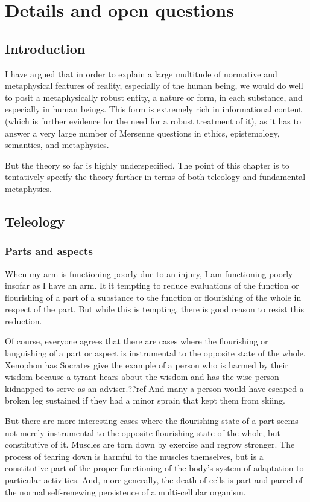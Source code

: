 \def\mychapter{X}

\chapter{Details and open questions}\label{ch:details}
\section{Introduction}
I have argued that in order to explain a large multitude of normative and metaphysical features 
of reality, especially of the human being, we would do well to posit a metaphysically robust 
entity, a nature or form, in each substance, and especially in human beings. This form is extremely rich 
in informational content (which is further evidence for the need for a robust treatment of it), 
as it has to answer a very large number of Mersenne questions in ethics, epistemology, semantics,
and metaphysics.

But the theory so far is highly underspecified. The point of this chapter is to tentatively specify 
the theory further in terms of both teleology and fundamental metaphysics. 

\section{Teleology}
\subsection{Parts and aspects}
When my arm is functioning poorly due to an injury, I am functioning poorly insofar
as I have an arm. It it tempting to reduce evaluations of the function or flourishing
of a part of a substance to the function or flourishing of the whole in respect of the
part. But while this is tempting, there is good reason to resist this reduction.

Of course, everyone agrees that there are cases where the flourishing or languishing of a part or aspect is
instrumental to the opposite state of the whole. Xenophon has Socrates give the example of a 
person who is harmed by their wisdom because a tyrant hears about the wisdom and has the
wise person kidnapped to serve as an adviser.??ref And many a person would have escaped a broken
leg sustained if they had a minor sprain that kept them from skiing. 

But there are more interesting cases where the flourishing state of a part seems not merely instrumental to 
the opposite flourishing state of the whole, but constitutive of it. Muscles are torn down by exercise
and regrow stronger. The process of tearing down is harmful to the muscles themselves, but is a constitutive 
part of the proper functioning of the body's system of adaptation to particular activities. And, more
generally, the death of cells is part and parcel of the normal self-renewing persistence of a multi-cellular
organism.

